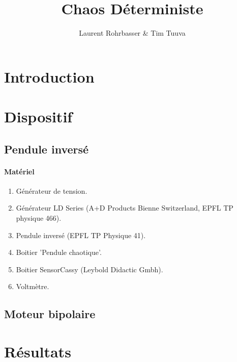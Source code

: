 \documentclass[a4paper,12pt,oneside]{article}
\begin{document}
\title{Chaos Déterministe}
\author{Laurent Rohrbasser \& Tim Tuuva}

\maketitle
\tableofcontents
\baselineskip=16pt
\parindent=15pt
\parskip=5pt

\begin{abstract}
\end{abstract}

\section{Introduction}

\section{Dispositif}
\subsection{Pendule inversé}

\paragraph{Matériel}
\begin{enumerate}
\item Générateur de tension.
\item Générateur LD Series (A+D Products Bienne Switzerland, EPFL TP physique 466).
\item Pendule inversé (EPFL TP Physique 41).
\item Boitier ’Pendule chaotique’.
\item Boitier SensorCassy (Leybold Didactic Gmbh).
\item Voltmètre.
\end{enumerate}

\subsection{Moteur bipolaire}

\section{Résultats}
\end{document}
